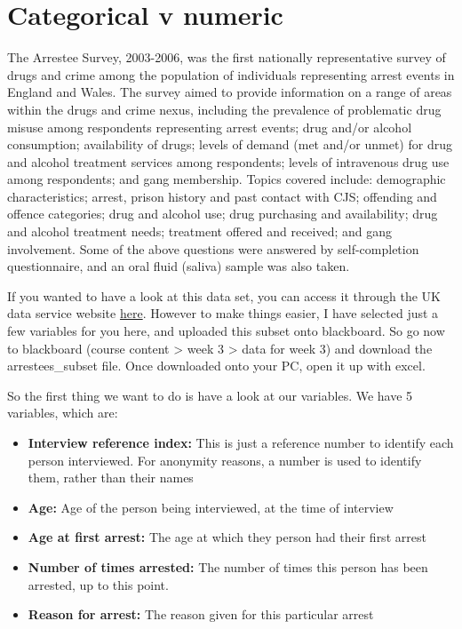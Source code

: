 \documentclass[]{book}
\providecommand{\tightlist}{%
  \setlength{\itemsep}{0pt}\setlength{\parskip}{0pt}}
\theoremstyle{definition}
\theoremstyle{definition}
\theoremstyle{definition}
\theoremstyle{remark}
\begin{document}
\hypertarget{categorical-v-numeric}{%
\section{Categorical v numeric}\label{categorical-v-numeric}}

The Arrestee Survey, 2003-2006, was the first nationally representative
survey of drugs and crime among the population of individuals
representing arrest events in England and Wales. The survey aimed to
provide information on a range of areas within the drugs and crime
nexus, including the prevalence of problematic drug misuse among
respondents representing arrest events; drug and/or alcohol consumption;
availability of drugs; levels of demand (met and/or unmet) for drug and
alcohol treatment services among respondents; levels of intravenous drug
use among respondents; and gang membership. Topics covered include:
demographic characteristics; arrest, prison history and past contact
with CJS; offending and offence categories; drug and alcohol use; drug
purchasing and availability; drug and alcohol treatment needs; treatment
offered and received; and gang involvement. Some of the above questions
were answered by self-completion questionnaire, and an oral fluid
(saliva) sample was also taken.

If you wanted to have a look at this data set, you can access it through
the UK data service website
\href{https://discover.ukdataservice.ac.uk/catalogue/?sn=5807}{here}.
However to make things easier, I have selected just a few variables for
you here, and uploaded this subset onto blackboard. So go now to
blackboard (course content \textgreater{} week 3 \textgreater{} data for
week 3) and download the arrestees\_subset file. Once downloaded onto
your PC, open it up with excel.

So the first thing we want to do is have a look at our variables. We
have 5 variables, which are:

\begin{itemize}
\tightlist
\item
  \textbf{Interview reference index:} This is just a reference number to
  identify each person interviewed. For anonymity reasons, a number is
  used to identify them, rather than their names\\
\item
  \textbf{Age:} Age of the person being interviewed, at the time of
  interview
\item
  \textbf{Age at first arrest:} The age at which they person had their
  first arrest\\
\item
  \textbf{Number of times arrested:} The number of times this person has
  been arrested, up to this point.
\item
  \textbf{Reason for arrest:} The reason given for this particular
  arrest
\end{itemize}
\end{document}
